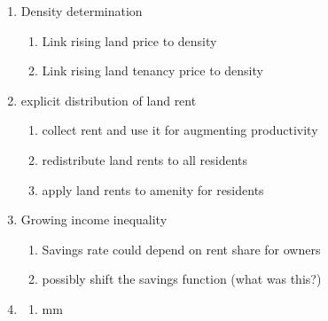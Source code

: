 \documentclass[12pt]{article}
\begin{document}
\begin{enumerate}
\item  Density determination
   \begin{enumerate}
         \item  Link rising land price to density
         \item  Link rising land tenancy price to density
    \end{enumerate}   
\item explicit distribution of land rent
     \begin{enumerate}
         \item  collect rent and use it for augmenting productivity
         \item redistribute land rents to all residents
         \item apply land rents to amenity for residents
     \end{enumerate}
    
    \item Growing income inequality
     \begin{enumerate}
         \item  Savings rate could depend on rent share for owners
         \item possibly shift the savings function (what was this?)
    \end{enumerate}
    
    \item 
    \begin{enumerate}
         \item  mm
    \end{enumerate}
\end{enumerate}
\end{document}
